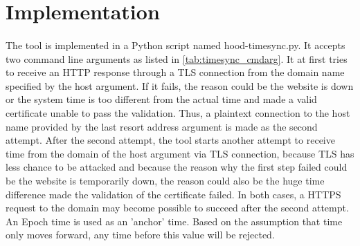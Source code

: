 \documentclass[mscthesis]{usiinfthesis}
\begin{document}
\section{Implementation}
\paragraph{}
The tool is implemented in a Python script named hood-timesync.py. It accepts two command line arguments as listed in \cref{tab:timesync_cmdarg}. It at first tries to receive an HTTP response through a TLS connection from the domain name specified by the host argument. If it fails, the reason could be the website is down or the system time is too different from the actual time and made a valid certificate unable to pass the validation. Thus, a plaintext connection to the host name provided by the last resort address argument is made as the second attempt. After the second attempt, the tool starts another attempt to receive time from the domain of the host argument via TLS connection, because TLS has less chance to be attacked and because the reason why the first step failed could be the website is temporarily down, the reason could also be the huge time difference made the validation of the certificate failed. In both cases, a HTTPS request to the domain may become possible to succeed after the second attempt. An Epoch time is used as an 'anchor' time. Based on the assumption that time only moves forward, any time before this value will be rejected.
\end{document}
